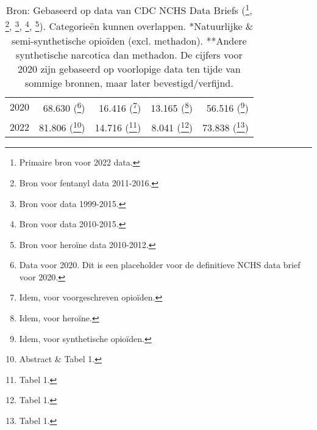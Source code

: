 \documentclass[11pt, a4paper]{report} %
\begin{document}
\begin{table}[htbp]
\begin{tabular}{l r r r r}
        2020 & 68.630  (\cite{Ahmad2021ProvisionalDrugOverdoseDeaths}\footnote{Data voor 2020. Dit is een placeholder voor de definitieve NCHS data brief voor 2020.})      & 16.416  (\cite{Ahmad2021ProvisionalDrugOverdoseDeaths}\footnote{Idem, voor voorgeschreven opioïden.})    & 13.165  (\cite{Ahmad2021ProvisionalDrugOverdoseDeaths}\footnote{Idem, voor heroïne.}) & 56.516 (\cite{Ahmad2021ProvisionalDrugOverdoseDeaths}\footnote{Idem, voor synthetische opioïden.}) \\
        2022 & 81.806  (\cite{CDC2024DataBrief491}\footnote{Abstract \& Tabel 1.})      & 14.716  (\cite{CDC2024DataBrief491}\footnote{Tabel 1.})    & 8.041   (\cite{CDC2024DataBrief491}\footnote{Tabel 1.}) & 73.838 (\cite{CDC2024DataBrief491}\footnote{Tabel 1.}) \\
        \bottomrule
    \end{tabular}
    \caption*{\footnotesize Bron: Gebaseerd op data van CDC NCHS Data Briefs (\cite{CDC2024DataBrief491}\footnote{Primaire bron voor 2022 data.}, \cite{CDC2022DataBrief457}\footnote{Bron voor fentanyl data 2011-2016.}, \cite{Hedegaard2017OverdoseDeathsUS}\footnote{Bron voor data 1999-2015.}, \cite{Rudd2016IncreasesDrugOpioidOverdoseDeaths}\footnote{Bron voor data 2010-2015.}, \cite{Rudd2014IncreasesHeroinOverdoseDeaths}\footnote{Bron voor heroïne data 2010-2012.}). Categorieën kunnen overlappen. *Natuurlijke \& semi-synthetische opioïden (excl. methadon). **Andere synthetische narcotica dan methadon. De cijfers voor 2020 zijn gebaseerd op voorlopige data ten tijde van sommige bronnen, maar later bevestigd/verfijnd.}
\end{table}
\end{document}
